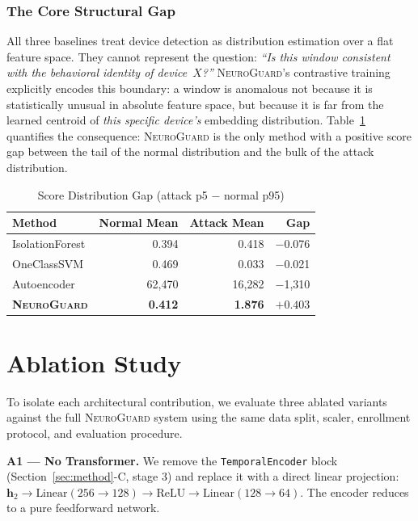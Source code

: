 \documentclass[journal,10pt,twoside]{IEEEtran}
\newcommand{\neuroguard}{\textsc{NeuroGuard}}
\begin{document}
\subsubsection{The Core Structural Gap}
All three baselines treat device detection as distribution estimation over a
flat feature space.
They cannot represent the question: \emph{``Is this window consistent with the
behavioral identity of device~$X$?''}
\neuroguard{}'s contrastive training explicitly encodes this boundary:
a window is anomalous not because it is statistically unusual in absolute
feature space, but because it is far from the learned centroid of \emph{this
specific device's} embedding distribution.
Table~\ref{tab:scoregap} quantifies the consequence: \neuroguard{} is the only
method with a positive score gap between the tail of the normal distribution
and the bulk of the attack distribution.

\begin{table}[!t]
  \caption{Score Distribution Gap (attack p5 $-$ normal p95)}
  \label{tab:scoregap}
  \centering
  \begin{tabular}{lrrr}
    \toprule
    Method & Normal Mean & Attack Mean & Gap \\
    \midrule
    IsolationForest & 0.394 & 0.418 & $-$0.076 \\
    OneClassSVM     & 0.469 & 0.033 & $-$0.021 \\
    Autoencoder     & 62{,}470 & 16{,}282 & $-$1{,}310 \\
    \midrule
    \textbf{\neuroguard{}} & \textbf{0.412} & \textbf{1.876} & $\mathbf{+0.403}$ \\
    \bottomrule
  \end{tabular}
\end{table}

\section{Ablation Study}
\label{sec:ablation}

To isolate each architectural contribution, we evaluate three ablated variants
against the full \neuroguard{} system using the same data split, scaler,
enrollment protocol, and evaluation procedure.

\textbf{A1 --- No Transformer.}
We remove the \texttt{TemporalEncoder} block (Section~\ref{sec:method}-C,
stage 3) and replace it with a direct linear projection:
$\mathbf{h}_2 \to \text{Linear}(256\to128) \to \text{ReLU} \to
\text{Linear}(128\to64)$.
The encoder reduces to a pure feedforward network.
\end{document}
